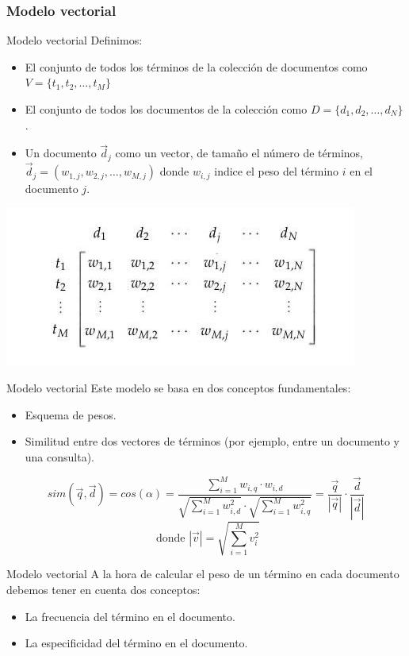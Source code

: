 \documentclass[ignorenonframetext,aspectratio=43,]{beamer}
\begin{document}
\subsubsection{Modelo vectorial}
\begin{frame}{Modelo vectorial}
Definimos:
\begin{itemize}
\item El conjunto de todos los términos de la colección de documentos como $V = \{t_1, t_2, \dots, t_M\}$
\item El conjunto de todos los documentos de la colección como $D = \{d_1,d_2, \dots, d_N\}$.
\item Un documento $\vec{d}_j$ como un vector, de tamaño el número de términos, $\vec{d}_j = (w_{1,j}, w_{2,j}, \dots , w_{M,j})$ donde $w_{i,j}$ indice el peso del término $i$ en el documento $j$.
\end{itemize}
\begin{center}
\includegraphics[scale=0.4]{./img/matrizpesos}
\end{center}
\end{frame}

\begin{frame}{Modelo vectorial}
Este modelo se basa en dos conceptos fundamentales:
\begin{itemize}
\item Esquema de pesos.
\item Similitud entre dos vectores de términos (por ejemplo, entre un documento y una consulta).
\end{itemize}
$$sim(\vec{q},\vec{d}) = cos(\alpha) = \frac{\sum_{i = 1}^M w_{i,q} \cdot w_{i,d}}{\sqrt{\sum_{i = 1}^M w_{i,d}^2} \cdot \sqrt{\sum_{i = 1}^M w_{i,q}^2}} = \frac{\vec{q}}{|\vec{q}|} \cdot \frac{\vec{d}}{|\vec{d}|} $$
$$ \textrm{ donde } |\vec{v}| = \sqrt{\sum_{i = 1}^M v_i^2}$$
\end{frame}

\begin{frame}{Modelo vectorial}
A la hora de calcular el peso de un término en cada documento debemos tener en cuenta dos conceptos:
\begin{itemize}
\item La frecuencia del término en el documento.
\item La especificidad del término en el documento.
\end{itemize}

\end{frame}
\end{document}
